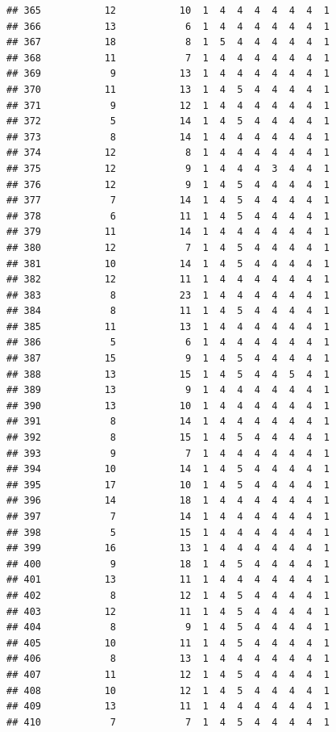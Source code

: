 \documentclass[12pt,]{krantz}
\theoremstyle{definition}
\theoremstyle{definition}
\theoremstyle{remark}
\begin{document}
\begin{verbatim}
## 365           12           10  1  4  4  4  4  4  4  1
## 366           13            6  1  4  4  4  4  4  4  1
## 367           18            8  1  5  4  4  4  4  4  1
## 368           11            7  1  4  4  4  4  4  4  1
## 369            9           13  1  4  4  4  4  4  4  1
## 370           11           13  1  4  5  4  4  4  4  1
## 371            9           12  1  4  4  4  4  4  4  1
## 372            5           14  1  4  5  4  4  4  4  1
## 373            8           14  1  4  4  4  4  4  4  1
## 374           12            8  1  4  4  4  4  4  4  1
## 375           12            9  1  4  4  4  3  4  4  1
## 376           12            9  1  4  5  4  4  4  4  1
## 377            7           14  1  4  5  4  4  4  4  1
## 378            6           11  1  4  5  4  4  4  4  1
## 379           11           14  1  4  4  4  4  4  4  1
## 380           12            7  1  4  5  4  4  4  4  1
## 381           10           14  1  4  5  4  4  4  4  1
## 382           12           11  1  4  4  4  4  4  4  1
## 383            8           23  1  4  4  4  4  4  4  1
## 384            8           11  1  4  5  4  4  4  4  1
## 385           11           13  1  4  4  4  4  4  4  1
## 386            5            6  1  4  4  4  4  4  4  1
## 387           15            9  1  4  5  4  4  4  4  1
## 388           13           15  1  4  5  4  4  5  4  1
## 389           13            9  1  4  4  4  4  4  4  1
## 390           13           10  1  4  4  4  4  4  4  1
## 391            8           14  1  4  4  4  4  4  4  1
## 392            8           15  1  4  5  4  4  4  4  1
## 393            9            7  1  4  4  4  4  4  4  1
## 394           10           14  1  4  5  4  4  4  4  1
## 395           17           10  1  4  5  4  4  4  4  1
## 396           14           18  1  4  4  4  4  4  4  1
## 397            7           14  1  4  4  4  4  4  4  1
## 398            5           15  1  4  4  4  4  4  4  1
## 399           16           13  1  4  4  4  4  4  4  1
## 400            9           18  1  4  5  4  4  4  4  1
## 401           13           11  1  4  4  4  4  4  4  1
## 402            8           12  1  4  5  4  4  4  4  1
## 403           12           11  1  4  5  4  4  4  4  1
## 404            8            9  1  4  5  4  4  4  4  1
## 405           10           11  1  4  5  4  4  4  4  1
## 406            8           13  1  4  4  4  4  4  4  1
## 407           11           12  1  4  5  4  4  4  4  1
## 408           10           12  1  4  5  4  4  4  4  1
## 409           13           11  1  4  4  4  4  4  4  1
## 410            7            7  1  4  5  4  4  4  4  1

\end{verbatim}
\end{document}
